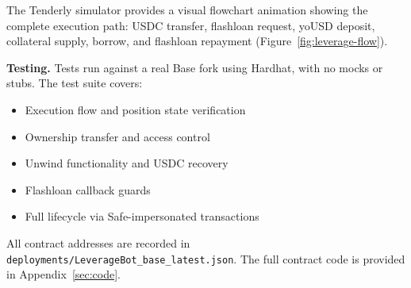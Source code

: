 The Tenderly simulator provides a visual flowchart animation showing the complete execution path: USDC transfer, flashloan request, yoUSD deposit, collateral supply, borrow, and flashloan repayment (Figure~\ref{fig:leverage-flow}).

\textbf{Testing.} Tests run against a real Base fork using Hardhat, with no mocks or stubs. The test suite covers:
\begin{itemize}
    \item Execution flow and position state verification
    \item Ownership transfer and access control
    \item Unwind functionality and USDC recovery
    \item Flashloan callback guards
    \item Full lifecycle via Safe-impersonated transactions
\end{itemize}

All contract addresses are recorded in \texttt{deployments/LeverageBot\_base\_latest.json}. The full contract code is provided in Appendix~\ref{sec:code}.

